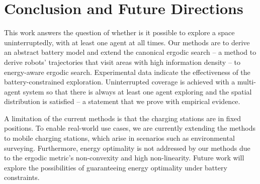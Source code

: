 \documentclass[letterpaper,10pt,conference,twoside]{IEEEtran}
\theoremstyle{definition}
\begin{document}
\section{Conclusion and Future Directions}\label{sec:conc}
\noindent
This work %
answers the question of whether is it possible to explore a space uninterruptedly, with at least one agent at all times. %
Our methods are to derive an abstract battery model and extend the canonical ergodic search -- a method to derive robots' trajectories that visit areas with high information density -- to energy-aware ergodic search. %
Experimental data indicate the effectiveness of the battery-constrained exploration. Uninterrupted coverage is achieved with a multi-agent system so that there is always at least one agent exploring and the spatial distribution is satisfied -- a statement that we prove with empirical evidence.

A limitation of the current methods is that the charging stations are in fixed positions. To enable real-world use cases, we are currently extending the methods to mobile charging stations, which arise in scenarios such as environmental surveying. Furthermore, energy optimality is not addressed by our methods due to the ergodic metric's non-convexity and high non-linearity. Future work will explore the possibilities of guaranteeing energy optimality under %
battery constraints. %

{\small
 

}
\end{document}
